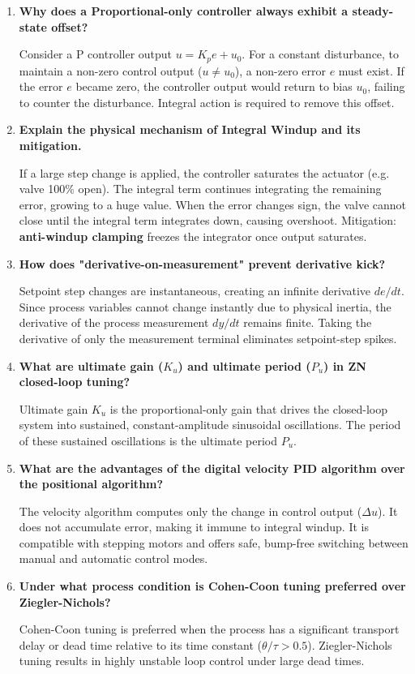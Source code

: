\documentclass[12pt,a4paper]{article}
\newcommand{\Q}[1]{\textbf{#1}\par\noindent\ignorespaces}
\begin{document}
\begin{tcolorbox}[exambox, title={\textbf{Frequently Asked / Viva Questions}}]
\begin{enumerate}[leftmargin=*, itemsep=4pt]
  \item \Q{Why does a Proportional-only controller always exhibit a steady-state offset?}
    Consider a P controller output $u = K_p e + u_0$. For a constant disturbance, to maintain a non-zero control output ($u \ne u_0$), a non-zero error $e$ must exist. If the error $e$ became zero, the controller output would return to bias $u_0$, failing to counter the disturbance. Integral action is required to remove this offset.
  \item \Q{Explain the physical mechanism of Integral Windup and its mitigation.}
    If a large step change is applied, the controller saturates the actuator (e.g. valve 100\% open). The integral term continues integrating the remaining error, growing to a huge value. When the error changes sign, the valve cannot close until the integral term integrates down, causing overshoot. Mitigation: \textbf{anti-windup clamping} freezes the integrator once output saturates.
  \item \Q{How does "derivative-on-measurement" prevent derivative kick?}
    Setpoint step changes are instantaneous, creating an infinite derivative $de/dt$. Since process variables cannot change instantly due to physical inertia, the derivative of the process measurement $dy/dt$ remains finite. Taking the derivative of only the measurement terminal eliminates setpoint-step spikes.
  \item \Q{What are ultimate gain ($K_u$) and ultimate period ($P_u$) in ZN closed-loop tuning?}
    Ultimate gain $K_u$ is the proportional-only gain that drives the closed-loop system into sustained, constant-amplitude sinusoidal oscillations. The period of these sustained oscillations is the ultimate period $P_u$.
  \item \Q{What are the advantages of the digital velocity PID algorithm over the positional algorithm?}
    The velocity algorithm computes only the change in control output ($\Delta u$). It does not accumulate error, making it immune to integral windup. It is compatible with stepping motors and offers safe, bump-free switching between manual and automatic control modes.
  \item \Q{Under what process condition is Cohen-Coon tuning preferred over Ziegler-Nichols?}
    Cohen-Coon tuning is preferred when the process has a significant transport delay or dead time relative to its time constant ($\theta/\tau > 0.5$). Ziegler-Nichols tuning results in highly unstable loop control under large dead times.
\end{enumerate}
\end{tcolorbox}
\end{document}
